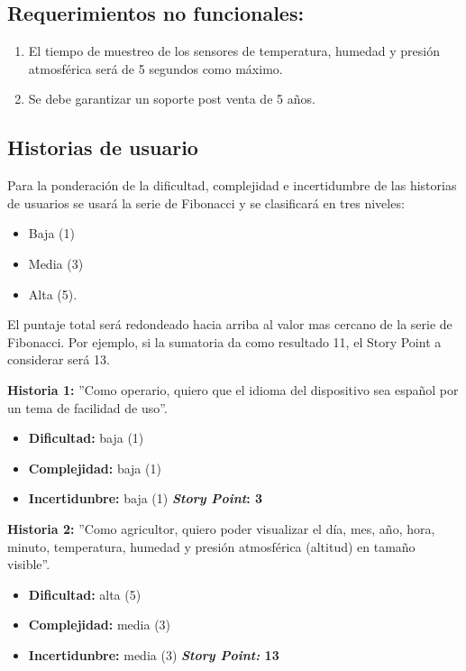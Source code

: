 \subsection{Requerimientos no funcionales:}
	\begin{enumerate}
		\item El tiempo de muestreo de los sensores de temperatura, humedad y presión atmosférica será de 5 segundos como máximo.
		\item Se debe garantizar un soporte post venta de 5 años.
	\end{enumerate}

\subsection{Historias de usuario}
\label{sec:backlog}
Para la ponderación de la dificultad, complejidad e incertidumbre de las historias de usuarios se usará la serie de Fibonacci y se clasificará en tres niveles: 
\begin{itemize}
\item Baja (1)
\item Media (3)
\item Alta (5).
\end{itemize}

El puntaje total será redondeado hacia arriba al valor mas cercano de la serie de Fibonacci. Por ejemplo, si la sumatoria da como resultado 11, el Story Point a considerar será 13.

\textbf{Historia 1:}
''Como operario, quiero que el idioma del dispositivo sea español por un tema de facilidad de uso''.
\begin{itemize}
\item \textbf{Dificultad:} baja (1)
\item \textbf{Complejidad:} baja (1)
\item \textbf{Incertidunbre:} baja (1)
\newline
\newline
\textbf{\textit{Story Point}: 3}
\end{itemize}

\textbf{Historia 2:}
''Como agricultor, quiero poder visualizar el día, mes, año, hora, minuto, temperatura, humedad y presión atmosférica (altitud) en tamaño visible''.
\begin{itemize}
\item \textbf{Dificultad:} alta (5)
\item \textbf{Complejidad:} media (3)
\item \textbf{Incertidunbre:} media (3)
\newline
\newline
\textbf{\textit{Story Point:} 13}
\end{itemize}

